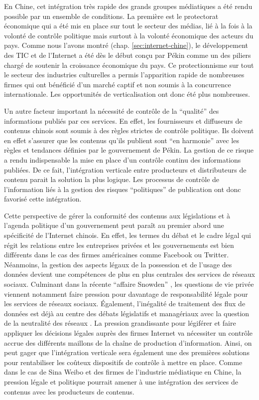 En Chine, cet intégration très rapide des grands groupes médiatiques a été rendu possible par un ensemble de conditions. La première est le protectorat économique qui a été mis en place sur tout le secteur des médias, lié à la fois à la volonté de contrôle politique mais surtout à la volonté économique des acteurs du pays. Comme nous l'avons montré (chap. \ref{sec:internet-chine}), le développement des TIC et de l'Internet a été dès le début conçu par Pékin comme un des piliers chargé de soutenir la croissance économique du pays. Ce protectionnisme sur tout le secteur des industries culturelles a permis l'apparition rapide de nombreuses firmes qui ont bénéficié d'un marché captif et non soumis à la concurrence internationale. Les opportunités de verticalisation ont donc été plus nombreuses. 

Un autre facteur important la nécessité de contrôle de la ``qualité'' des informations publiés par ces services. En effet, les fournisseurs et diffuseurs de contenus chinois sont soumis à des règles strictes de contrôle politique. Ils doivent en effet s'assurer que les contenus qu'ils publient sont ``en harmonie'' avec les règles et tendances définies par le gouvernement de Pékin. La gestion de ce risque a rendu indispensable la mise en place d'un contrôle continu des informations publiées. De ce fait, l'intégration verticale entre producteurs et distributeurs de contenu parait la solution la plus logique. Les processus de contrôle de l'information liés à la gestion des risques ``politiques'' de publication ont donc favorisé cette intégration.



Cette perspective de gérer la conformité des contenus aux législations et à l'agenda politique d'un gouvernement peut paraît au premier abord une spécificité de l'Internet chinois. En effet, les termes du débat et le cadre légal qui régit les relations entre les entreprises privées et les gouvernements est bien différents dans le cas des firmes américaines comme Facebook ou Twitter. Néanmoins, la gestion des aspects légaux de la possession et de l'usage des données devient une compétences de plus en plus centrales des services de réseaux sociaux. Culminant dans la récente ``affaire Snowden'' \cite{Greenwald2013}, les questions de vie privée viennent notamment faire pression pour davantage de responsabilité légale pour les services de réseaux sociaux. Également, l'inégalité de traitement des flux de données est déjà au centre des débats législatifs et managériaux avec la question de la neutralité des réseaux \cite{Schafer2011}. La pression grandissante pour légiférer et faire appliquer les décisions légales auprès des firmes Internet va nécessiter un contrôle accrue des différents maillons de la chaîne de production d'information. Ainsi, on peut gager que l'intégration verticale sera également une des premières solutions pour rentabiliser les coûteux dispositifs de contrôle à mettre en place. Comme dans le cas de Sina Weibo et des firmes de l'industrie médiatique en Chine, la pression légale et politique pourrait amener à une intégration des services de contenus avec les producteurs de contenus.

